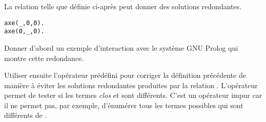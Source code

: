 \begin{Exercise}
La relation  telle que définie ci-après peut donner des
solutions redondantes.
\begin{verbatim}
axe(_,0,0).
axe(0,_,0).
\end{verbatim}
Donner d'abord un exemple d'interaction avec le système GNU Prolog qui
montre cette redondance.

Utiliser ensuite l'opérateur prédéfini  pour
corriger la définition précédente de manière à éviter les solutions
redondantes produites par la relation .
L'opérateur  permet de tester si les termes
\emph{clos} \codeinline et  sont différents.  C'est un opérateur
impur car il ne permet pas, par exemple, d'énumérer tous les termes
 possibles qui sont différents de .
\end{Exercise}